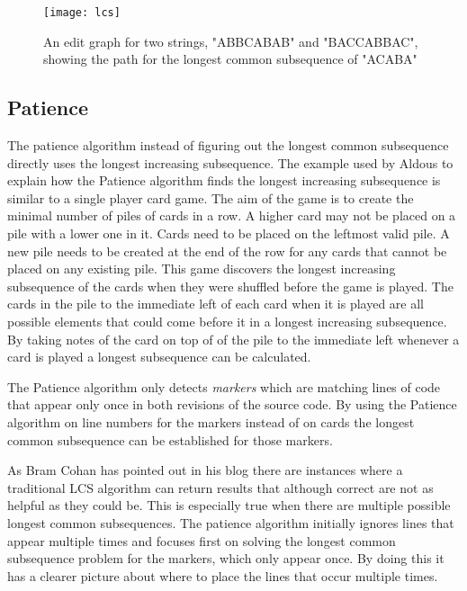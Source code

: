 \begin{figure}[!t]
 \begin{center}
 \texttt{[image: lcs]}
 \end{center}
 \caption{An edit graph for two strings, "ABBCABAB" and "BACCABBAC", showing the path for the longest common subsequence of "ACABA"}
 \label{fig:lcs}
\end{figure}



\subsection{Patience}
The patience algorithm instead of figuring out the longest common subsequence directly uses the longest increasing subsequence. 
The example used by Aldous \cite{Aldous1999} to explain how the Patience algorithm finds the longest increasing subsequence is similar to a single player card game.
The aim of the game is to create the minimal number of piles of cards in a row.
A higher card may not be placed on a pile with a lower one in it.
Cards need to be placed on the leftmost valid pile. 
A new pile needs to be created at the end of the row for any cards that cannot be placed on any existing pile.
This game discovers the longest increasing subsequence of the cards when they were shuffled before the game is played.
The cards in the pile to the immediate left of each card when it is played are all possible elements that could come before it in a longest increasing subsequence.
By taking notes of the card on top of of the pile to the immediate left whenever a card is played a longest subsequence can be calculated.     

The Patience algorithm only detects \emph{markers} which are matching lines of code that appear only once in both revisions of the source code.
By using the Patience algorithm on line numbers for the markers instead of on cards the longest common subsequence can be established for those markers. 

As Bram Cohan \cite{bramcohen} has pointed out in his blog there are instances where a traditional LCS algorithm can return results that although correct are not as helpful as they could be.
This is especially true when there are multiple possible longest common subsequences.
The patience algorithm initially ignores lines that appear multiple times and focuses first on solving the longest common subsequence problem for the markers, which only appear once. 
By doing this it has a clearer picture about where to place the lines that occur multiple times.

